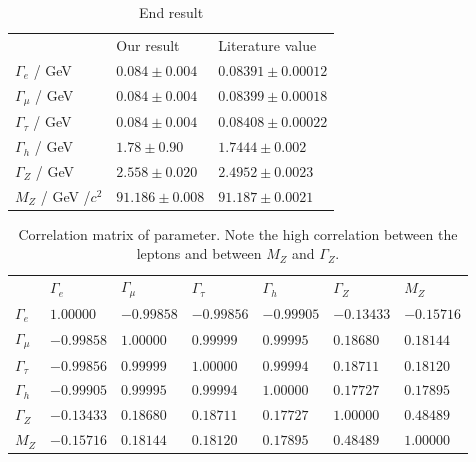 \begin{table}[htpb]
    \centering
    \caption{End result}
\label{tab:results}
    \begin{tabular}{l l l}
 \rowcolor{LightCyan} & Our result & Literature value \\
 \cellcolor{LightCyan}$\Gamma_e$ / GeV &   $ 0.084\pm0.004   $ & $0.08391 \pm 0.00012 $\\
 \cellcolor{LightCyan}$\Gamma_\mu$ / GeV&   $ 0.084\pm0.004 $ & $0.08399 \pm 0.00018 $\\
 \cellcolor{LightCyan}$\Gamma_\tau$ / GeV&   $ 0.084\pm0.004   $ & $0.08408 \pm 0.00022 $\\
 \cellcolor{LightCyan}$\Gamma_h$ / GeV&   $ 1.78\pm0.90     $ & $1.7444\pm0.002      $\\
 \cellcolor{LightCyan}$\Gamma_Z$ / GeV&   $ 2.558\pm0.020   $ & $2.4952\pm0.0023     $\\
 \cellcolor{LightCyan}$M_Z    $ / GeV /$c^2$&   $ 91.186\pm0.008  $ & $91.187\pm0.0021     $\\
    \end{tabular}
\end{table}

\begin{table}[htpb]
    \centering
    \caption{Correlation matrix of parameter. Note the high correlation between the leptons and between $M_Z$ and $\Gamma_Z$.}
    \label{tab:covmat}

\begin{tabular}{l| l| l| l |l | l|l}
\rowcolor{LightCyan} & $\Gamma_e$ & $\Gamma_\mu$ & $\Gamma_\tau$ & $\Gamma_h$ &$\Gamma_Z$ & $M_Z$ \\ 
\cellcolor{LightCyan} $\Gamma_e$ & $1.00000$ & $-0.99858$ & $-0.99856$ & $-0.99905$ & $-0.13433$ & $-0.15716$ \\ 
\cellcolor{LightCyan} $\Gamma_\mu$ & $-0.99858$ & $1.00000$ & $0.99999$ & $0.99995$ & $0.18680$ & $0.18144$ \\ 
\cellcolor{LightCyan} $\Gamma_\tau$ & $-0.99856$ & $0.99999$ & $1.00000$ & $0.99994$ & $0.18711$ & $0.18120$ \\ 
\cellcolor{LightCyan} $\Gamma_h$ & $-0.99905$ & $0.99995$ & $0.99994$ & $1.00000$ & $0.17727$ & $0.17895$ \\ 
\cellcolor{LightCyan} $\Gamma_Z$ & $-0.13433$ & $0.18680$ & $0.18711$ & $0.17727$ & $1.00000$ & $0.48489$ \\ 
\cellcolor{LightCyan} $M_Z$ & $-0.15716$ & $0.18144$ & $0.18120$ & $0.17895$ & $0.48489$ & $1.00000$ \\ 
\end{tabular}



\end{table}

